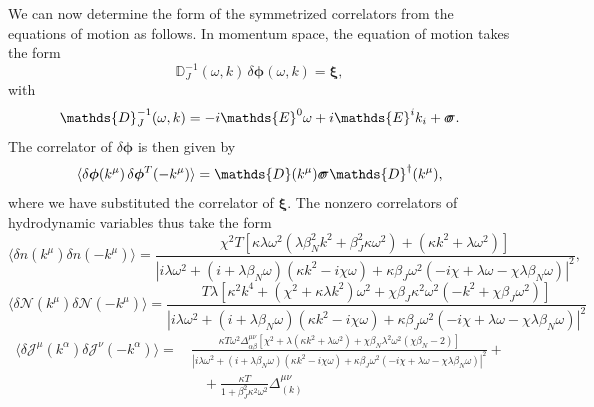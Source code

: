\documentclass[aps,prd,nofootinbib,amsmath,amssymb,showpacs,longbibliography,singlecolumn,superscriptaddress,notitlepage]{revtex4-1}
\theoremstyle{plain}
\theoremstyle{definition}
\newcommand*{\Scale}[2][4]{\scalebox{#1}{$#2$}}%
\newcommand{\forceds}[1]{\Scale[1.1]{\ensuremath{\mathrlap{{{#1}}}\hspace{1.4pt}#1}}}
\newcommand{\cvec}[1]{\ensuremath{\bm {#1}}}
\newcommand{\cmat}[1]{\ensuremath{\mathds{{#1}}}}
\newcommand{\cmatgreek}[1]{\ensuremath{\forceds{{#1}}}}
\begin{document}
We can now determine the form of the symmetrized correlators from the equations of motion as follows. In momentum space, the equation of motion takes the form 
\begin{equation}
    \cmat{D}_J^{-1}(\omega,k)\, \delta \cvec{\phi}(\omega,k) = \cvec{\xi} ,
\end{equation}
with
\begin{equation}
    \cmat{D}_J^{-1}(\omega,k) =  -i\cmat{E}^0 \omega + i \cmat{E}^i k_i + \cmatgreek{\sigma} .
\end{equation}
The correlator of $\delta \cvec{\phi}$ is then given by 
\begin{equation}
    \langle \delta \cvec{\phi}(k^\mu) \,\delta \cvec{\phi}^T(-k^\mu) \rangle = \cmat{D}  (k^\mu) \cmatgreek{\sigma} \cmat{D}^{\dagger} ( k^\mu)  ,
\end{equation}
where we have substituted the correlator of $\cvec{\xi}$. The nonzero correlators of hydrodynamic variables thus take the form 
\begin{equation}
    \langle \delta n(k^{\mu}) \delta n(-k^{\mu}) \rangle = \frac{\chi^2 T \left[ \kappa \lambda \omega^2 \left( \lambda \beta_N^2 k^2 + \beta_J^2 \kappa \omega^2 \right) + \left( \kappa k^2 + \lambda \omega^2 \right) \right]}{\left| i \lambda \omega^2 + (i + \lambda \beta_N \omega) \left( \kappa k^2 - i \chi \omega \right) + \kappa \beta_J \omega^2 \left( -i\chi + \lambda \omega - \chi \lambda \beta_N \omega \right) \right|^2} ,
\end{equation}
\begin{equation}
    \langle \delta \mathcal{N}(k^{\mu}) \delta \mathcal{N}(-k^{\mu}) \rangle = \frac{T \lambda \left[ \kappa^2 k^4 + \left( \chi^2 + \kappa \lambda k^2 \right) \omega^2 + \chi \beta_J \kappa^2 \omega^2 \left( -k^2 + \chi \beta_J \omega^2 \right) \right]}{\left| i \lambda \omega^2 + (i + \lambda \beta_N \omega) \left( \kappa k^2 - i \chi \omega \right) + \kappa \beta_J \omega^2 \left( -i\chi + \lambda \omega - \chi \lambda \beta_N \omega \right) \right|^2}
\end{equation}
\begin{equation}
\begin{split}
    \langle \delta \mathcal{J}^{\mu}(k^{\alpha}) \delta \mathcal{J}^{\nu}(-k^{\alpha}) \rangle = \, & \frac{\kappa T \omega^2 \Delta^{\mu\nu}_{\alpha\beta} \left[ \chi^2 + \lambda \left( \kappa k^2 + \lambda \omega^2 \right) + \chi \beta_N \lambda^2 \omega^2 (\chi \beta_N - 2) \right]}{\left| i \lambda \omega^2 + (i + \lambda \beta_N \omega) \left( \kappa k^2 - i \chi \omega \right) + \kappa \beta_J \omega^2 \left( -i\chi + \lambda \omega - \chi \lambda \beta_N \omega \right) \right|^2} + \\
    & \,\,\,\,\, + \frac{\kappa T}{1 + \beta_J^2 \kappa^2 \omega^2} \Delta_{(k)}^{\mu\nu}
\end{split}
\end{equation}
\end{document}
